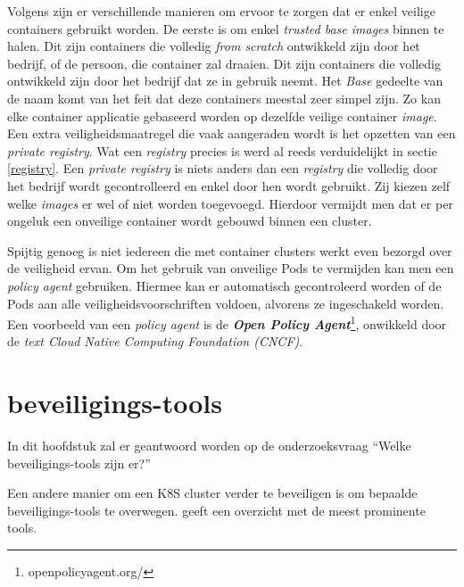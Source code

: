 Volgens \textcite{Lewis2019} zijn er verschillende manieren om ervoor te zorgen dat er enkel veilige containers gebruikt worden. De eerste is om enkel \textit{trusted base images} binnen te halen. Dit zijn containers die volledig \textit{from scratch} ontwikkeld zijn door het bedrijf, of de persoon, die container zal draaien. Dit zijn containers die volledig ontwikkeld zijn door het bedrijf dat ze in gebruik neemt. Het \textit{Base} gedeelte van de naam komt van het feit dat deze containers meestal zeer simpel zijn. Zo kan elke container applicatie gebaseerd worden op dezelfde veilige container \textit{image}.
Een extra veiligheidsmaatregel die vaak aangeraden wordt is het opzetten van een \textit{private registry}. Wat een \textit{registry} precies is werd al reeds verduidelijkt in sectie \ref{registry}. Een \textit{private registry} is niets anders dan een \textit{registry} die volledig door het bedrijf wordt gecontrolleerd en enkel door hen wordt gebruikt. Zij kiezen zelf welke \textit{images} er wel of niet worden toegevoegd. Hierdoor vermijdt men dat er per ongeluk een onveilige container wordt gebouwd binnen een cluster.

Spijtig genoeg is niet iedereen die met container clusters werkt even bezorgd over de veiligheid ervan. Om het gebruik van onveilige Pods te vermijden kan men een \textit{policy agent} gebruiken. Hiermee kan er automatisch gecontroleerd worden of de Pods aan alle veiligheidsvoorschriften voldoen, alvorens ze ingeschakeld worden. Een voorbeeld van een \textit{policy agent} is de \textbf{\textit{Open Policy Agent}}\footnote{openpolicyagent.org/}, onwikkeld door de \textit{text Cloud Native Computing Foundation (CNCF)}.

%
%

\section{beveiligings-tools} \label{tools}

 In dit hoofdstuk zal er geantwoord worden op de onderzoeksvraag ``Welke beveiligings-tools zijn er?''

Een andere manier om een K8S cluster verder te beveiligen is om bepaalde beveiligings-tools te overwegen.
\textcite{Taylor2019} geeft een overzicht met de meest prominente tools.

